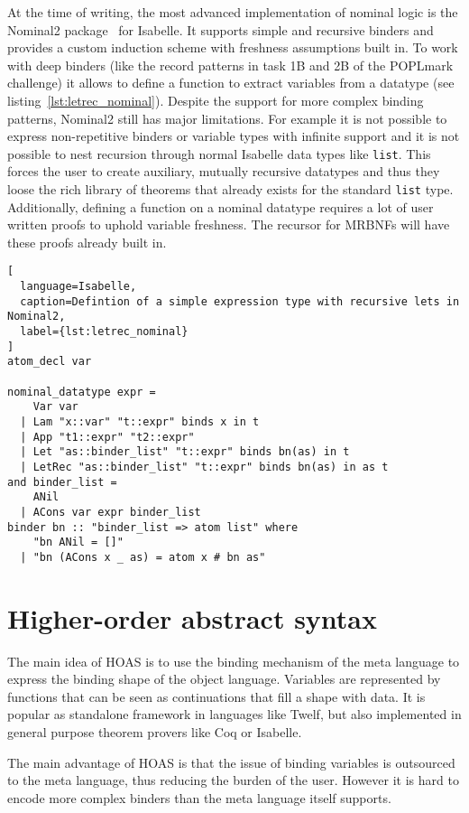 At the time of writing, the most advanced implementation of nominal logic is the Nominal2 package~\cite{nominal2} for Isabelle. It supports simple and recursive binders and provides a custom induction scheme with freshness assumptions built in. To work with deep binders (like the record patterns in task 1B and 2B of the POPLmark challenge) it allows to define a function to extract variables from a datatype (see listing~\ref{lst:letrec_nominal}). Despite the support for more complex binding patterns, Nominal2 still has major limitations. For example it is not possible to express non-repetitive binders or variable types with infinite support and it is not possible to nest recursion through normal Isabelle data types like \texttt{list}. This forces the user to create auxiliary, mutually recursive datatypes and thus they loose the rich library of theorems that already exists for the standard \texttt{list} type. Additionally, defining a function on a nominal datatype requires a lot of user written proofs to uphold variable freshness. The recursor for \acp{MRBNF} will have these proofs already built in.

\begin{lstlisting}[
  language=Isabelle,
  caption=Defintion of a simple expression type with recursive lets in Nominal2,
  label={lst:letrec_nominal}
]
atom_decl var

nominal_datatype expr =
    Var var
  | Lam "x::var" "t::expr" binds x in t
  | App "t1::expr" "t2::expr"
  | Let "as::binder_list" "t::expr" binds bn(as) in t
  | LetRec "as::binder_list" "t::expr" binds bn(as) in as t
and binder_list =
    ANil
  | ACons var expr binder_list
binder bn :: "binder_list => atom list" where
    "bn ANil = []"
  | "bn (ACons x _ as) = atom x # bn as"
\end{lstlisting}

\section{Higher-order abstract syntax}

The main idea of \ac{HOAS} is to use the binding mechanism of the meta language to express the binding shape of the object language. Variables are represented by functions that can be seen as continuations that fill a shape with data. It is popular as standalone framework in languages like Twelf\cite{twelf}, but also implemented in general purpose theorem provers like Coq or Isabelle.

The main advantage of \ac{HOAS} is that the issue of binding variables is outsourced to the meta language, thus reducing the burden of the user. However it is hard to encode more complex binders than the meta language itself supports.
